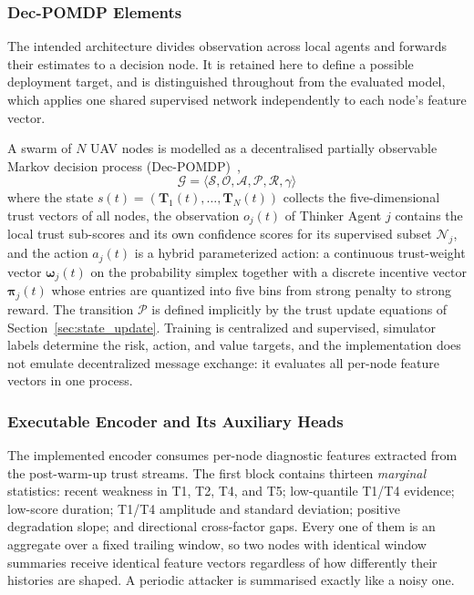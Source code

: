 \documentclass[notspecified,article,submit,moreauthors]{Definitions/mdpi}
\begin{document}
\subsubsection{Dec-POMDP Elements}
The intended architecture divides observation across local agents and forwards their estimates to a decision node. It is retained here to define a possible deployment target, and is distinguished throughout from the evaluated model, which applies one shared supervised network independently to each node's feature vector.

A swarm of $N$ UAV nodes is modelled as a decentralised partially observable Markov decision process (Dec-POMDP)~\cite{oliehoek2008optimal},
\begin{equation}
\mathcal{G} = \langle \mathcal{S}, \mathcal{O}, \mathcal{A}, \mathcal{P}, \mathcal{R}, \gamma \rangle
\end{equation}
where the state $s(t) = (\mathbf{T}_1(t), \dots, \mathbf{T}_N(t))$ collects the five-dimensional trust vectors of all nodes, the observation $o_j(t)$ of Thinker Agent $j$ contains the local trust sub-scores and its own confidence scores for its supervised subset $\mathcal{N}_j$, and the action $a_j(t)$ is a hybrid parameterized action: a continuous trust-weight vector $\boldsymbol{\omega}_j(t)$ on the probability simplex together with a discrete incentive vector $\boldsymbol{\pi}_j(t)$ whose entries are quantized into five bins from strong penalty to strong reward. The transition $\mathcal{P}$ is defined implicitly by the trust update equations of Section~\ref{sec:state_update}. Training is centralized and supervised, simulator labels determine the risk, action, and value targets, and the implementation does not emulate decentralized message exchange: it evaluates all per-node feature vectors in one process.

\subsubsection{Executable Encoder and Its Auxiliary Heads}
The implemented encoder consumes per-node diagnostic features extracted from the post-warm-up trust streams. The first block contains thirteen \emph{marginal} statistics: recent weakness in T1, T2, T4, and T5; low-quantile T1/T4 evidence; low-score duration; T1/T4 amplitude and standard deviation; positive degradation slope; and directional cross-factor gaps. Every one of them is an aggregate over a fixed trailing window, so two nodes with identical window summaries receive identical feature vectors regardless of how differently their histories are shaped. A periodic attacker is summarised exactly like a noisy one.
\end{document}
